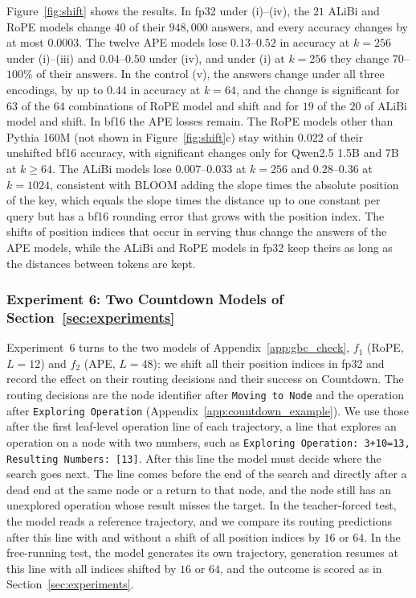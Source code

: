 Figure~\ref{fig:shift} shows the results. In fp32 under (i)--(iv), the $21$ ALiBi and RoPE models change $40$ of their $948{,}000$ answers, and every accuracy changes by at most $0.0003$. The twelve APE models lose $0.13$--$0.52$ in accuracy at $k=256$ under (i)--(iii) and $0.04$--$0.50$ under (iv), and under (i) at $k=256$ they change $70$--$100\%$ of their answers. In the control (v), the answers change under all three encodings, by up to $0.44$ in accuracy at $k=64$, and the change is significant for $63$ of the $64$ combinations of RoPE model and shift and for $19$ of the $20$ of ALiBi model and shift. In bf16 the APE losses remain. The RoPE models other than Pythia 160M (not shown in Figure~\ref{fig:shift}c) stay within $0.022$ of their unshifted bf16 accuracy, with significant changes only for Qwen2.5 1.5B and 7B at $k\ge64$. The ALiBi models lose $0.007$--$0.033$ at $k=256$ and $0.28$--$0.36$ at $k=1024$, consistent with BLOOM adding the slope times the absolute position of the key, which equals the slope times the distance up to one constant per query but has a bf16 rounding error that grows with the position index. The shifts of position indices that occur in serving thus change the answers of the APE models, while the ALiBi and RoPE models in fp32 keep theirs as long as the distances between tokens are kept.

\subsubsection{Experiment 6: Two Countdown Models of Section~\ref{sec:experiments}}
\label{app:g1}

Experiment~6 turns to the two models of Appendix~\ref{app:gbc_check}, $f_1$ (RoPE, $L=12$) and $f_2$ (APE, $L=48$): we shift all their position indices in fp32 and record the effect on their routing decisions and their success on Countdown. The routing decisions are the node identifier after \texttt{Moving to Node} and the operation after \texttt{Exploring Operation} (Appendix~\ref{app:countdown_example}). We use those after the first leaf-level operation line of each trajectory, a line that explores an operation on a node with two numbers, such as \texttt{Exploring Operation: 3+10=13, Resulting Numbers: [13]}. After this line the model must decide where the search goes next. The line comes before the end of the search and directly after a dead end at the same node or a return to that node, and the node still has an unexplored operation whose result misses the target. In the teacher-forced test, the model reads a reference trajectory, and we compare its routing predictions after this line with and without a shift of all position indices by $16$ or $64$. In the free-running test, the model generates its own trajectory, generation resumes at this line with all indices shifted by $16$ or $64$, and the outcome is scored as in Section~\ref{sec:experiments}.

